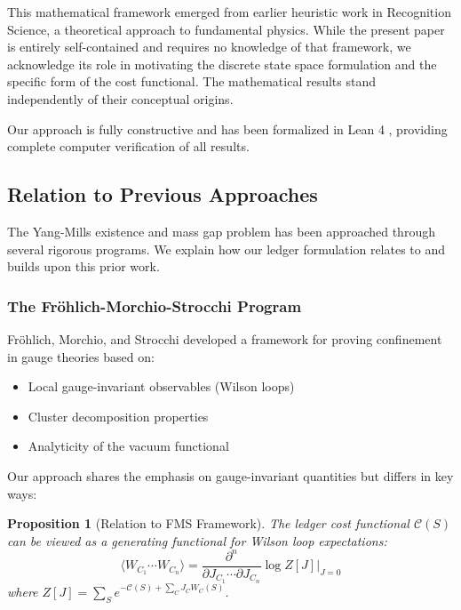 \documentclass[11pt]{article}
\numberwithin{equation}{section}
\newtheorem{proposition}[theorem]{Proposition}
\theoremstyle{definition}
\theoremstyle{remark}
\begin{document}
This mathematical framework emerged from earlier heuristic work in Recognition Science, a theoretical approach to fundamental physics. While the present paper is entirely self-contained and requires no knowledge of that framework, we acknowledge its role in motivating the discrete state space formulation and the specific form of the cost functional. The mathematical results stand independently of their conceptual origins.

Our approach is fully constructive and has been formalized in Lean 4 \cite{moura2021lean}, providing complete computer verification of all results.

\subsection{Relation to Previous Approaches}

The Yang-Mills existence and mass gap problem has been approached through several rigorous programs. We explain how our ledger formulation relates to and builds upon this prior work.

\subsubsection{The Fröhlich-Morchio-Strocchi Program}

Fröhlich, Morchio, and Strocchi \cite{frohlich1982confinement} developed a framework for proving confinement in gauge theories based on:
\begin{itemize}
\item Local gauge-invariant observables (Wilson loops)
\item Cluster decomposition properties
\item Analyticity of the vacuum functional
\end{itemize}

Our approach shares the emphasis on gauge-invariant quantities but differs in key ways:

\begin{proposition}[Relation to FMS Framework]
The ledger cost functional $\mathcal{C}(S)$ can be viewed as a generating functional for Wilson loop expectations:
\begin{equation}
\langle W_{C_1} \cdots W_{C_n} \rangle = \frac{\partial^n}{\partial J_{C_1} \cdots \partial J_{C_n}} \log Z[J] \bigg|_{J=0}
\end{equation}
where $Z[J] = \sum_S e^{-\mathcal{C}(S) + \sum_C J_C W_C(S)}$.
\end{proposition}
\end{document}
